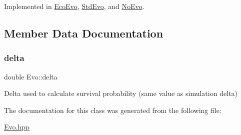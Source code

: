 Implemented in \hyperlink{classEcoEvo_adfd00eb377489649a279e567abc3ae94}{Eco\+Evo}, \hyperlink{classStdEvo_a6d4c64918a01dd00ad5185796b67e219}{Std\+Evo}, and \hyperlink{classNoEvo_ae404207f48accfa7ea9f0022ed1af187}{No\+Evo}.



\subsection{Member Data Documentation}
\hypertarget{classEvo_a8f02598dfb1249ad135fbc741c27e0e0}{}\label{classEvo_a8f02598dfb1249ad135fbc741c27e0e0} 
\subsubsection{\texorpdfstring{delta}{delta}}
{\footnotesize\ttfamily double Evo\+::delta\hspace{0.3cm}{\ttfamily [protected]}}

Delta used to calculate survival probability (same value as simulation delta) 

The documentation for this class was generated from the following file\+:\begin{DoxyCompactItemize}
\item 
\hyperlink{Evo_8hpp}{Evo.\+hpp}\end{DoxyCompactItemize}
